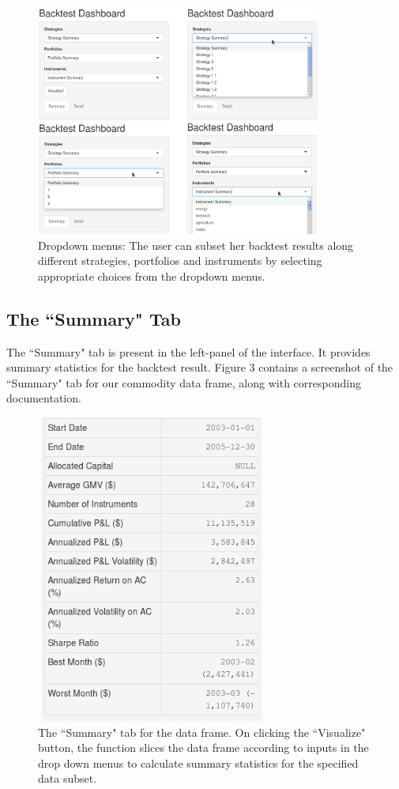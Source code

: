 \documentclass[article]{jss}
\begin{document}
\begin{figure}[H]
\centering
\includegraphics[width = \textwidth, height = 3in]{img/dropdown.png}
\caption{Dropdown menus: The user can subset her backtest results along different strategies, portfolios and instruments by selecting appropriate choices from the dropdown menus.}
\end{figure}

\subsection{The ``Summary" Tab}

The ``Summary" tab is present in the left-panel of the  interface. It provides summary statistics for the backtest result. Figure 3 contains a screenshot of the ``Summary" tab for our commodity data frame, along with corresponding documentation.


\begin{figure}[H]
\centering
\includegraphics[width = 3in, height = 4in]{img/summary.png}
\caption{The ``Summary" tab for the  data frame. On clicking the ``Visualize" button, the function slices the data frame according to inputs in the drop down menus to calculate summary statistics for the specified data subset.
}
\end{figure}
\end{document}
